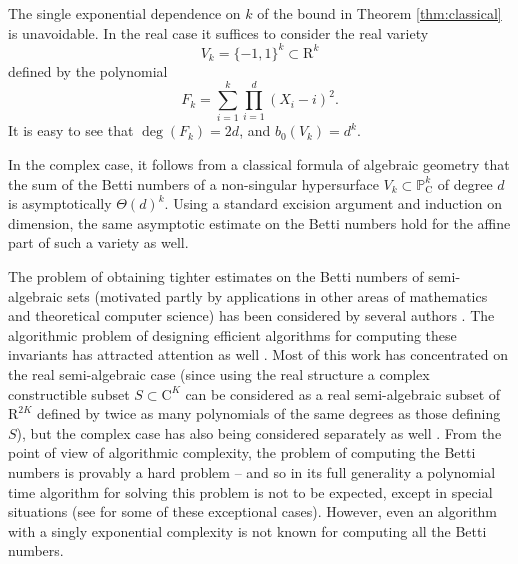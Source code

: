 \documentclass{amsart}
\theoremstyle{definition}
\theoremstyle{remark}
\numberwithin{equation}{section}
\begin{document}
The single exponential dependence on $k$ of the bound in Theorem \ref{thm:classical} is unavoidable. In the real case it suffices to consider the real variety
\begin{equation}
\label{eg:basic}
V_k = \{-1,1\}^k \subset {\mathrm{R}}^k
\end{equation}
defined by the polynomial
\[
F_k = \sum_{i=1}^k \prod_{i=1}^d (X_i-i)^2.
\]
It is easy to see that $\deg(F_k)  =2d$, and  $b_0(V_k) = d^k$.

In the complex case, it follows from a classical formula of algebraic geometry \cite{Hirzebruch-book}
that the sum of the Betti numbers of a non-singular hypersurface  $V_k \subset {\mathbb{P}}_{\mathrm{C}}^k$
of degree $d$ is asymptotically $\Theta(d)^k$. 
Using a standard excision argument and induction on
dimension, the same
asymptotic estimate on the Betti numbers hold for the affine part of such a variety as well.

The problem of obtaining tighter estimates on the Betti numbers of semi-algebraic sets 
(motivated partly by applications in other areas of mathematics and theoretical computer science)
has been considered by several authors \cite{Basu1,GV07,BPR8}. 
The algorithmic problem of designing efficient
algorithms for computing these invariants has attracted attention as well \cite{BPRbettione,Bas05-first}. Most of this
work has concentrated on the real semi-algebraic case (since using the real structure a complex
constructible subset $S \subset {\mathrm{C}}^K$ can be considered as a real semi-algebraic subset of ${\mathrm{R}}^{2 K}$
defined by twice as many polynomials of the same degrees as those defining $S$), but the complex
case has also being considered separately as well \cite{Scheiblechner07, Walther1}. From the point of
view of algorithmic complexity, the problem of computing the Betti numbers is provably a hard problem -- and so in its full generality a polynomial time algorithm for solving this problem is not to be expected, except in special situations (see \cite{BP'R07joa, Bas05-top} for some of these exceptional
cases). However, even an algorithm with a singly exponential complexity is not known for computing all
the Betti numbers. 
\end{document}
